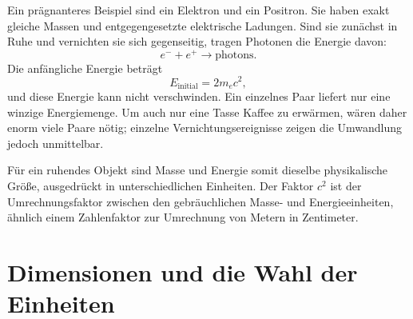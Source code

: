Ein prägnanteres Beispiel sind ein Elektron und ein Positron. Sie haben exakt gleiche Massen und entgegengesetzte elektrische Ladungen. Sind sie zunächst in Ruhe und vernichten sie sich gegenseitig, tragen Photonen die Energie davon:
\begin{equation}
e^-+e^+\longrightarrow \text{photons}.
\end{equation}
Die anfängliche Energie beträgt
\begin{equation}
E_{\mathrm{initial}}=2m_e c^2,
\end{equation}
und diese Energie kann nicht verschwinden. Ein einzelnes Paar liefert nur eine winzige Energiemenge. Um auch nur eine Tasse Kaffee zu erwärmen, wären daher enorm viele Paare nötig; einzelne Vernichtungsereignisse zeigen die Umwandlung jedoch unmittelbar.

Für ein ruhendes Objekt sind Masse und Energie somit dieselbe physikalische Größe, ausgedrückt in unterschiedlichen Einheiten. Der Faktor \(c^2\) ist der Umrechnungsfaktor zwischen den gebräuchlichen Masse- und Energieeinheiten, ähnlich einem Zahlenfaktor zur Umrechnung von Metern in Zentimeter.

\begin{classroomqa}\end{classroomqa}

\section{Dimensionen und die Wahl der Einheiten}

